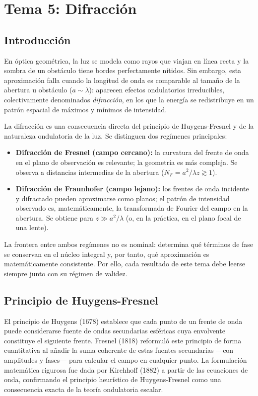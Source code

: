 \documentclass[12pt, a4paper]{article}
\theoremstyle{plain}
\theoremstyle{definition}
\theoremstyle{remark}
\begin{document}
\section{Tema 5: Difracción}

\subsection{Introducción}

En óptica geométrica, la luz se modela como rayos que viajan en línea recta y
la sombra de un obstáculo tiene bordes perfectamente nítidos. Sin embargo, esta
aproximación falla cuando la longitud de onda es comparable al tamaño de la
abertura u obstáculo ($a \sim \lambda$): aparecen efectos ondulatorios
irreducibles, colectivamente denominados \emph{difracción}, en los que la
energía se redistribuye en un patrón espacial de máximos y mínimos de
intensidad.

La difracción es una consecuencia directa del principio de Huygens-Fresnel y
de la naturaleza ondulatoria de la luz. Se distinguen dos regímenes principales:

\begin{itemize}
  \item \textbf{Difracción de Fresnel (campo cercano):} la curvatura del frente
        de onda en el plano de observación es relevante; la geometría es más
        compleja. Se observa a distancias intermedias de la abertura
        ($N_F = a^2/\lambda z \gtrsim 1$).
  \item \textbf{Difracción de Fraunhofer (campo lejano):} los frentes de onda
        incidente y difractado pueden aproximarse como planos; el patrón de
        intensidad observado es, matemáticamente, la transformada de Fourier del
        campo en la abertura. Se obtiene para $z \gg a^2/\lambda$ (o, en
        la práctica, en el plano focal de una lente).
\end{itemize}

La frontera entre ambos regímenes no es nominal: determina qué términos de fase
se conservan en el núcleo integral y, por tanto, qué aproximación es
matemáticamente consistente. Por ello, cada resultado de este tema debe leerse
siempre junto con su régimen de validez.

\subsection{Principio de Huygens-Fresnel}

El principio de Huygens (1678) establece que cada punto de un frente de onda puede
considerarse fuente de ondas secundarias esféricas cuya envolvente constituye el
siguiente frente. Fresnel (1818) reformuló este principio de forma cuantitativa
al añadir la suma coherente de estas fuentes secundarias —con amplitudes y fases—
para calcular el campo en cualquier punto. La formulación matemática rigurosa fue
dada por Kirchhoff (1882) a partir de las ecuaciones de onda, confirmando el
principio heurístico de Huygens-Fresnel como una consecuencia exacta de la teoría
ondulatoria escalar.
\end{document}
